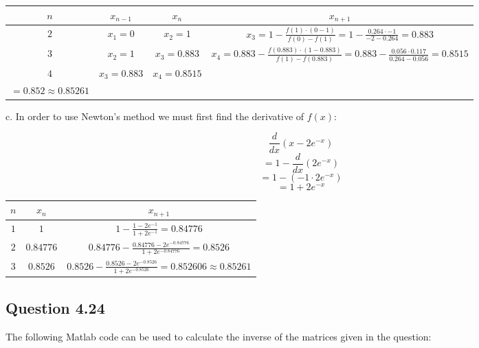 \documentclass[12pt]{article}
\begin{document}
\begin{center}
    \begin{tabular}{|c||c|c|c|}
        \hline
        $n$ & $x_{n-1}$ & $x_{n}$ & $x_{n+1}$ \\
        \hline
        $2$ & $x_{1} = 0$ & $x_{2} = 1$ &
        $ x_{3} = 1 - \frac{f(1) \cdot (0 - 1)}{f(0) - f(1)} = 1 - \frac{0.264 \cdot -1}{{-2} - 0.264} = 0.883 $ \\
        $3$ & $x_{2} = 1$ & $ x_{3} = 0.883$ & $x_{4} = 0.883 - \frac{f(0.883) \cdot (1 - 0.883)}{f(1) - f(0.883)} = 0.883 - \frac{0.056 \cdot 0.117}{0.264 - 0.056} = 0.8515 $ \\
        $4$ & $x_{3} = 0.883$ & $x_{4} = 0.8515$ & \makecell{$ x_{5} = 0.8515 - \frac{f(0.8515) \cdot (0.883 - 0.8515)}{f(0.883) - f(0.8515)} = 0.8515 - \frac{-0.002 \cdot 0.0315}{0.056 - (-0.002)} $\\$ = 0.852 \approx 0.85261 $} \\
        \hline
    \end{tabular}
\end{center}

\noindent c. In order to use Newton's method we must first find the derivative of $f(x)$:

$$ \frac{d}{dx} (x - 2e^{-x}) $$
$$ = 1 - \frac{d}{dx} (2e^{-x}) $$
$$ = 1 - (-1 \cdot 2e^{-x}) $$
$$ = 1 + 2e^{-x} $$

\begin{center}
    \begin{tabular}{|c||c|c|}
        \hline
        $n$ & $x_{n}$ & $x_{n+1}$ \\
        \hline
        $1$ & $1$ & $ 1 - \frac{1 - 2e^{-1}}{1 + 2e^{-1}} = 0.84776 $ \\
        \hline
        $2$ & $0.84776$ & $ 0.84776 - \frac{0.84776 - 2e^{-0.84776}}{1 + 2e^{-0.84776}} = 0.8526 $ \\
        \hline
        $3$ & $0.8526$ & $ 0.8526 - \frac{0.8526 - 2e^{-0.8526}}{1 + 2e^{-0.8526}} = 0.852606 \approx 0.85261 $ \\
        \hline
    \end{tabular}
\end{center}

\subsection*{Question 4.24}

\noindent The following Matlab code can be used to calculate the inverse of the matrices given in the question:
\end{document}
